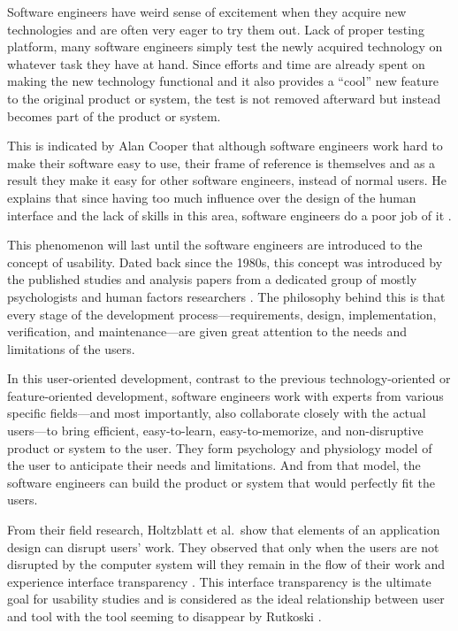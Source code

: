 \documentclass{acm_proc_article-sp}
\begin{document}
Software engineers have weird sense of excitement when they acquire
new technologies and are often very eager to try them out. Lack of
proper testing platform, many software engineers simply test the newly
acquired technology on whatever task they have at hand. Since efforts
and time are already spent on making the new technology functional and
it also provides a ``cool'' new feature to the original product or
system, the test is not removed afterward but instead becomes part of
the product or system.

This is indicated by Alan Cooper that although software engineers work
hard to make their software easy to use, their frame of reference is
themselves and as a result they make it easy for other software
engineers, instead of normal users. He explains that since having too
much influence over the design of the human interface and the lack of
skills in this area, software engineers do a poor job of it
\cite{inmates:cooper}.

This phenomenon will last until the software engineers are introduced
to the concept of usability. Dated back since the 1980s, this concept
was introduced by the published studies and analysis papers from a
dedicated group of mostly psychologists and human factors researchers
\cite{human:rubinstein, friendly:simpson, human:shneiderman,
  human:brown, software:dumas}. The philosophy behind this is that
every stage of the development process---requirements, design,
implementation, verification, and maintenance---are given great
attention to the needs and limitations of the users.

In this user-oriented development, contrast to the previous
technology-oriented or feature-oriented development, software
engineers work with experts from various specific fields---and most
importantly, also collaborate closely with the actual users---to bring
efficient, easy-to-learn, easy-to-memorize, and non-disruptive product
or system to the user. They form psychology and physiology model of
the user to anticipate their needs and limitations. And from that
model, the software engineers can build the product or system that
would perfectly fit the users.

From their field research, Holtzblatt et al.\ show that elements of an
application design can disrupt users' work. They observed that only
when the users are not disrupted by the computer system will they
remain in the flow of their work and experience interface transparency
\cite{transparency:holtzblatt}. This interface transparency is the
ultimate goal for usability studies and is considered as the ideal
relationship between user and tool with the tool seeming to disappear
by Rutkoski \cite{transparency:rutkoski}.
\end{document}

